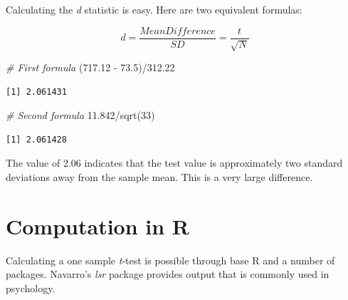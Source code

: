 \documentclass[
  11pt,
]{book}
\newenvironment{Shaded}{\begin{snugshade}}{\end{snugshade}}
\newcommand{\AttributeTok}[1]{\textcolor[rgb]{0.77,0.63,0.00}{#1}}
\newcommand{\CommentTok}[1]{\textcolor[rgb]{0.56,0.35,0.01}{\textit{#1}}}
\newcommand{\DecValTok}[1]{\textcolor[rgb]{0.00,0.00,0.81}{#1}}
\newcommand{\FloatTok}[1]{\textcolor[rgb]{0.00,0.00,0.81}{#1}}
\newcommand{\FunctionTok}[1]{\textcolor[rgb]{0.00,0.00,0.00}{#1}}
\newcommand{\NormalTok}[1]{#1}
\newcommand{\SpecialCharTok}[1]{\textcolor[rgb]{0.00,0.00,0.00}{#1}}
\begin{document}
Calculating the \emph{d} statistic is easy. Here are two equivalent formulas:

\[d = \frac{Mean Difference}{SD}=\frac{t}{\sqrt{N}}\]

\begin{Shaded}
\begin{Highlighting}[]
\CommentTok{\# First formula}
\NormalTok{(}\FloatTok{717.12} \SpecialCharTok{{-}} \FloatTok{73.5}\NormalTok{)}\SpecialCharTok{/}\FloatTok{312.22}
\end{Highlighting}
\end{Shaded}

\begin{verbatim}
[1] 2.061431
\end{verbatim}

\begin{Shaded}
\begin{Highlighting}[]
\CommentTok{\# Second formula}
\FloatTok{11.842}\SpecialCharTok{/}\FunctionTok{sqrt}\NormalTok{(}\DecValTok{33}\NormalTok{)}
\end{Highlighting}
\end{Shaded}

\begin{verbatim}
[1] 2.061428
\end{verbatim}

The value of 2.06 indicates that the test value is approximately two standard deviations away from the sample mean. This is a very large difference.

\hypertarget{computation-in-r}{%
\section{Computation in R}\label{computation-in-r}}

Calculating a one sample \emph{t}-test is possible through base R and a number of packages. Navarro's \citeyearpar{navarro_book_2020} \emph{lsr} package provides output that is commonly used in psychology.

\begin{Shaded}
\end{Shaded}
\end{document}
